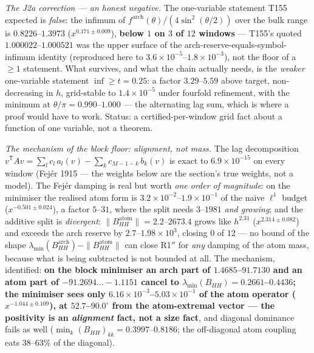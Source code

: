 \documentclass[11pt,a4paper]{article}
\begin{document}
\emph{The J2a correction --- an honest negative.} The one-variable statement T155
expected is \emph{false}: the infimum of $f^{\mathrm{arch}}(\theta)/(4\sin^2(\theta/2))$
over the bulk range is $0.8226$--$1.3973$ ($x^{0.171\pm0.009}$), \textbf{below $1$ on $3$
of $12$ windows} --- T155's quoted $1.000022$--$1.000521$ was the upper surface of the
arch-reserve-equals-symbol-infimum identity (reproduced here to
$3.6\times10^{-5}$--$1.8\times10^{-3}$), not the floor of a $\ge1$ statement. What
survives, and what the chain actually needs, is the \emph{weaker} one-variable statement
$\inf\ge t=0.25$: a factor $3.29$--$5.59$ above target, non-decreasing in $h$, grid-stable
to $1.4\times10^{-5}$ under fourfold refinement, with the minimum at
$\theta/\pi=0.990$--$1.000$ --- the alternating lag sum, which is where a proof would have
to work. Status: a certified-per-window grid fact about a function of one variable, not a
theorem.

\emph{The mechanism of the block floor: alignment, not mass.} The lag decomposition
$v^{\mathsf T}Av=\sum_l c_l\,a_l(v)-\sum_k c_{M-1-k}\,b_k(v)$ is exact to
$6.9\times10^{-15}$ on every window (Fej\'er 1915 --- the weights below are the section's
true weights, not a model). The Fej\'er damping is real but worth \emph{one order of
magnitude}: on the minimiser the realised atom form is
$3.2\times10^{-2}$--$1.9\times10^{-1}$ of the naive $\ell^1$ budget ($x^{-0.501\pm0.024}$),
a factor $5$--$31$, where the split needs $3$--$1981$ \emph{and growing}; and the additive
split is \emph{divergent}: $\|B^{\mathrm{atom}}_{HH}\|=2.2$--$2673.4$ grows like
$h^{2.31}$ ($x^{2.314\pm0.082}$) and exceeds the arch reserve by $2.7$--$1.98\times10^{3}$,
closing $0$ of $12$ --- no bound of the shape
$\lambda_{\min}(B^{\mathrm{arch}}_{HH})-\|B^{\mathrm{atom}}_{HH}\|$ can close R1$''$ for
\emph{any} damping of the atom mass, because what is being subtracted is not bounded at
all. The mechanism, identified: \textbf{on the block minimiser an arch part of
$1.4685$--$91.7130$ and an atom part of $-91.2694\ldots-1.1151$ cancel to
$\lambda_{\min}(B_{HH})=0.2661$--$0.4436$; the minimiser sees only
$6.16\times10^{-3}$--$5.03\times10^{-1}$ of the atom operator ($x^{-1.044\pm0.109}$), at
$52.7$--$90.0^\circ$ from the atom-extremal vector --- the positivity is an
\emph{alignment} fact, not a size fact}, and diagonal dominance fails as well
($\min_k(B_{HH})_{kk}=0.3997$--$0.8186$; the off-diagonal atom coupling eats
$38$--$63\%$ of the diagonal).
\end{document}
